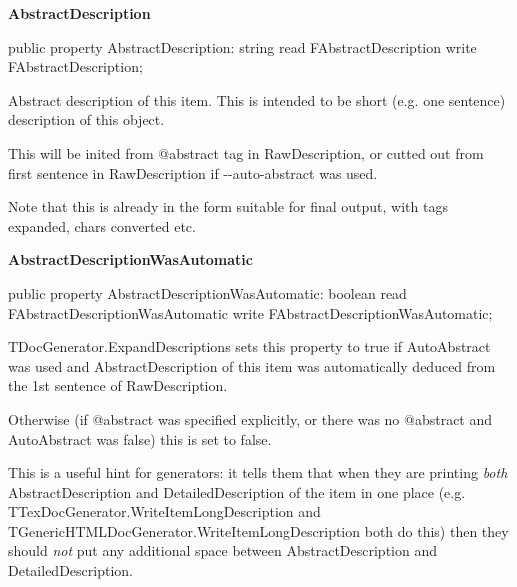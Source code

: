 \documentclass{report}
\newif\ifpdf
\begin{document}
\begin{list}{}{
\setlength{\itemindent}{0cm}
\setlength{\listparindent}{0cm}
\setlength{\leftmargin}{\evensidemargin}
\addtolength{\leftmargin}{\tmplength}
\settowidth{\labelsep}{X}
\addtolength{\leftmargin}{\labelsep}
\setlength{\labelwidth}{\tmplength}
}
\label{PasDoc_Items.TPasItem-AbstractDescription}
\item[\textbf{AbstractDescription}\hfill]
\ifpdf
\begin{flushleft}
\fi
\begin{ttfamily}
public property AbstractDescription: string
      read FAbstractDescription write FAbstractDescription;\end{ttfamily}

\ifpdf
\end{flushleft}
\fi


\par Abstract description of this item. This is intended to be short (e.g. one sentence) description of this object.

This will be inited from @abstract tag in RawDescription, or cutted out from first sentence in RawDescription if {-}{-}auto{-}abstract was used.

Note that this is already in the form suitable for final output, with tags expanded, chars converted etc.\label{PasDoc_Items.TPasItem-AbstractDescriptionWasAutomatic}
\item[\textbf{AbstractDescriptionWasAutomatic}\hfill]
\ifpdf
\begin{flushleft}
\fi
\begin{ttfamily}
public property AbstractDescriptionWasAutomatic: boolean
      read FAbstractDescriptionWasAutomatic
      write FAbstractDescriptionWasAutomatic;\end{ttfamily}

\ifpdf
\end{flushleft}
\fi


\par TDocGenerator.ExpandDescriptions sets this property to true if AutoAbstract was used and AbstractDescription of this item was automatically deduced from the 1st sentence of RawDescription.

Otherwise (if @abstract was specified explicitly, or there was no @abstract and AutoAbstract was false) this is set to false.

This is a useful hint for generators: it tells them that when they are printing \textit{both} AbstractDescription and DetailedDescription of the item in one place (e.g. TTexDocGenerator.WriteItemLongDescription and TGenericHTMLDocGenerator.WriteItemLongDescription both do this) then they should \textit{not} put any additional space between AbstractDescription and DetailedDescription.


\end{list}
\end{document}
